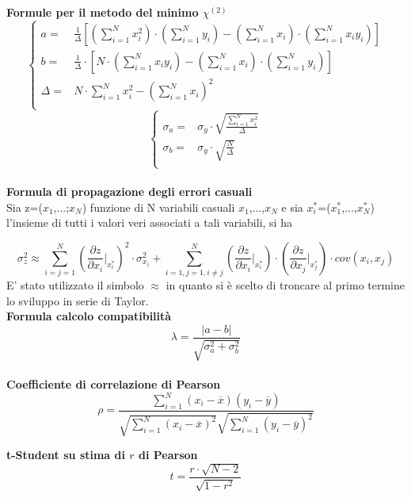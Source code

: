 \documentclass[a4paper,11pt,oneside]{article}
\begin{document}
\textbf{Formule per il metodo del minimo ${\chi}^{(2)}$}
\begin{equation*}
        \begin{cases}
    a=&\frac{1}{\Delta}[(\sum\limits_{i=1}^{N}{x_{i}^{2}})\cdot(\sum\limits_{i=1}^{N}{y_{i}})-(\sum\limits_{i=1}^{N}{x_{i}})\cdot(\sum\limits_{i=1}^{N}{x_{i}y_{i}})] \\ 
    b=&\frac{1}{\Delta }\cdot \left [N\cdot \left ( \sum\limits_{i=1}^{N}x_i y_i \right )-\left ( \sum\limits_{i=1}^{N}x_i \right )\cdot \left ( \sum\limits_{i=1}^{N}y_i \right )  \right ]\\
    \Delta=& N\cdot \sum\limits_{i=1}^{N} x_i^{2} - \left ( \sum\limits_{i=1}^{N}x_i \right )^{2}\\
    \end{cases}
\end{equation*}
\begin{equation*}
    \begin{cases}
    \sigma_{a}=&\sigma_{y}\cdot\sqrt{\frac{\sum_{i=1}^{N}{x_{i}^{2}}}{\Delta}} \\
    \sigma_{b}=&\sigma_y\cdot \sqrt{\frac{N}{\Delta }}\\
    \end{cases}
    \label{equation:err_chi_quadro}
\end{equation*}
\\
\textbf{Formula di propagazione degli errori casuali}\\

Sia z=($x_1$,...;$x_N$) funzione di N variabili casuali $x_1$,...,$x_N$ e sia ${x_i^\ast}$=($x_1^\ast$,...,$x_N^{\ast}$) l'insieme di tutti i valori veri associati a tali variabili, si ha 

\begin{equation*}
    \sigma_z^{2}\approx  \sum_{i=j=1}^{N}\left ( \frac{\partial z}{\partial x_i}\Big|_{x_i^{\ast}} \right )^{2}\cdot\sigma_{x_i}^{2} +\sum_{i=1,j=1,i\neq j}^{N}\left (\frac{\partial z }{\partial x_i}\Big|_{x_i^{\ast}} \right ) \cdot \left ( \frac{\partial z}{\partial x_j} \Big|_{x_j^{\ast}} \right )\cdot cov(x_i,x_j)\label{eq:prop_errori}
\end{equation*}
E' stato utilizzato il simbolo $\approx$ in quanto si è scelto di troncare al primo termine lo sviluppo in serie di Taylor.\\


\textbf{Formula calcolo compatibilità}\\
\begin{equation*}
    \lambda=\frac{\left|a-b\right|}{\sqrt{\sigma^{2}_{a}+\sigma^{2}_{b}}}
\end{equation*}\\
\textbf{Coefficiente di correlazione di Pearson}\\
\begin{equation*}
    \rho=  \frac{\sum_{i=1}^{N}(x_i - \overline{x}
    )(y_i - \overline{y})}{\sqrt{\sum_{i=1}^{N}(x_i -\overline{x})^2}\sqrt{\sum_{i=1}^{N}(y_i - \overline{y})^2}}
\end{equation*}

\textbf{t-Student su stima di $r$ di Pearson}\\
\begin{equation*}
    t=\frac{r \cdot \sqrt{N-2} }{\sqrt{1- r^2}}
\end{equation*}
\end{document}
